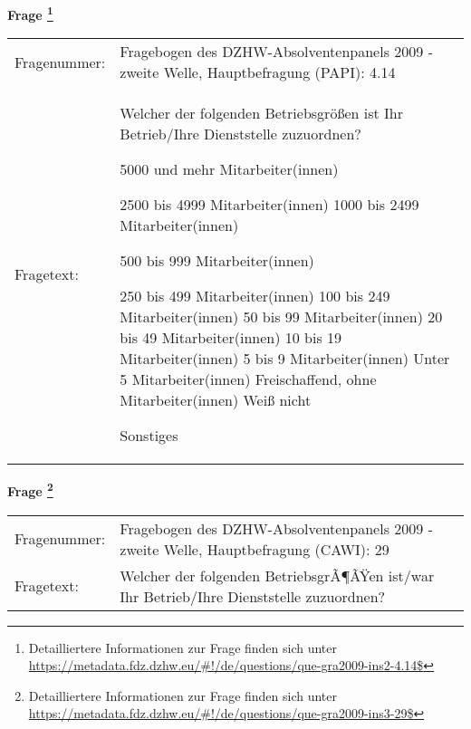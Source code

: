 				\vspace*{0.5cm}
                \noindent\textbf{Frage
	                \footnote{Detailliertere Informationen zur Frage finden sich unter
		              \url{https://metadata.fdz.dzhw.eu/\#!/de/questions/que-gra2009-ins2-4.14$}}}\\
				\begin{tabularx}{\hsize}{@{}lX}
					Fragenummer: &
					  Fragebogen des DZHW-Absolventenpanels 2009 - zweite Welle, Hauptbefragung (PAPI):
					  4.14
 \\
					Fragetext: & Welcher der folgenden Betriebsgrößen ist Ihr Betrieb/Ihre Dienststelle zuzuordnen?\par  5000 und mehr Mitarbeiter(innen)\par  2500 bis 4999 Mitarbeiter(innen) 1000 bis 2499 Mitarbeiter(innen)\par  500 bis 999 Mitarbeiter(innen)\par  250 bis 499 Mitarbeiter(innen) 100 bis 249 Mitarbeiter(innen) 50 bis 99 Mitarbeiter(innen) 20 bis 49 Mitarbeiter(innen) 10 bis 19 Mitarbeiter(innen) 5 bis 9 Mitarbeiter(innen) Unter 5 Mitarbeiter(innen) Freischaffend, ohne Mitarbeiter(innen) Weiß nicht\par  Sonstiges \\
				\end{tabularx}
				\vspace*{0.5cm}
                \noindent\textbf{Frage
	                \footnote{Detailliertere Informationen zur Frage finden sich unter
		              \url{https://metadata.fdz.dzhw.eu/\#!/de/questions/que-gra2009-ins3-29$}}}\\
				\begin{tabularx}{\hsize}{@{}lX}
					Fragenummer: &
					  Fragebogen des DZHW-Absolventenpanels 2009 - zweite Welle, Hauptbefragung (CAWI):
					  29
 \\
					Fragetext: & Welcher der folgenden BetriebsgrÃ¶ÃŸen ist/war Ihr Betrieb/Ihre Dienststelle zuzuordnen? \\
				\end{tabularx}





